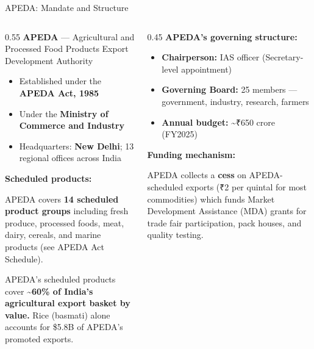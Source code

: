 \documentclass[
  ignorenonframetext,
  aspectratio=169,
]{beamer}
\makeatletter
\providecommand{\tightlist}{%
  \setlength{\itemsep}{0pt}\setlength{\parskip}{0pt}}
\let\quarto@originallabel\label
\DeclareRobustCommand*{\label}[1]{\quarto@originallabel{#1}}
\makeatother
\begin{document}
\begin{frame}{APEDA: Mandate and Structure}
\label{apeda-mandate-and-structure}
\begin{columns}[T]
\begin{column}{0.55\linewidth}
\textbf{APEDA} --- Agricultural and Processed Food Products Export
Development Authority

\begin{itemize}
\tightlist
\item
  Established under the \textbf{APEDA Act, 1985}
\item
  Under the \textbf{Ministry of Commerce and Industry}
\item
  Headquarters: \textbf{New Delhi}; 13 regional offices across India
\end{itemize}

\textbf{Scheduled products:}

APEDA covers \textbf{14 scheduled product groups} including fresh
produce, processed foods, meat, dairy, cereals, and marine products (see
APEDA Act Schedule).

APEDA's scheduled products cover \textbf{\textasciitilde60\% of India's
agricultural export basket by value.} Rice (basmati) alone accounts for
\$5.8B of APEDA's promoted exports.
\end{column}

\begin{column}{0.45\linewidth}
\textbf{APEDA's governing structure:}

\begin{itemize}
\tightlist
\item
  \textbf{Chairperson:} IAS officer (Secretary-level appointment)
\item
  \textbf{Governing Board:} 25 members --- government, industry,
  research, farmers
\item
  \textbf{Annual budget:} \textasciitilde₹650 crore (FY2025)
\end{itemize}

\textbf{Funding mechanism:}

APEDA collects a \textbf{cess} on APEDA-scheduled exports (₹2 per
quintal for most commodities) which funds Market Development Assistance
(MDA) grants for trade fair participation, pack houses, and quality
testing.
\end{column}
\end{columns}

\end{frame}
\end{document}
